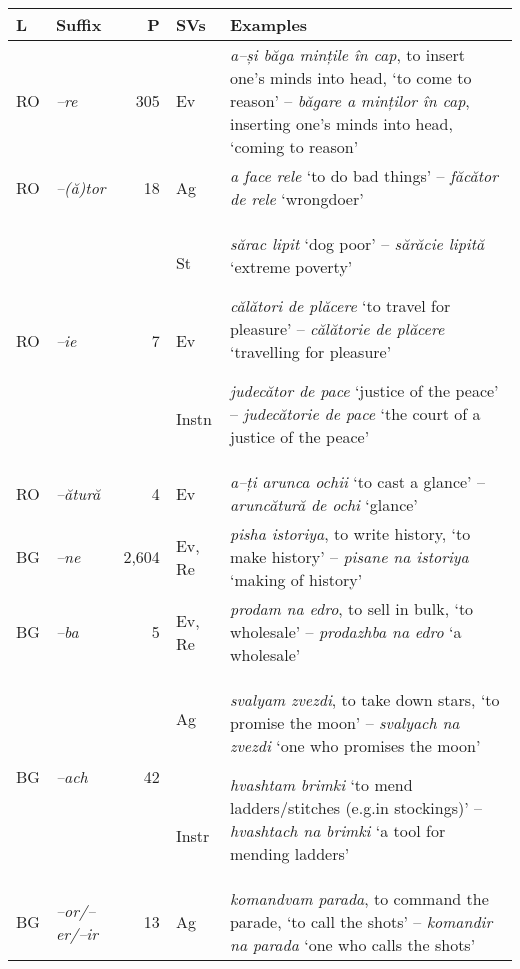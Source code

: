 \documentclass[output=paper]{langsci/langscibook}
\begin{document}
\begin{table}
\begin{tabular}{p{0.4cm} p{1.2cm} r p{1cm} p{6.9cm}}
\lsptoprule
{ \textbf{L}} &
{ \textbf{Suffix}} &
{ \textbf{P}} &
{ \textbf{SVs}} &
{ \textbf{Examples}}\\
\midrule
{ RO} &
{ \textit{–re}} &
{ 305} &
{ Ev} &
{ \textit{a–și băga mințile în cap},  to insert
one’s minds into head, ‘to come to reason’ -- \textit{băgare a minților în
cap}, inserting one’s minds into head, ‘coming to reason’}\\
{ RO} &
{ \textit{–(ă)tor}} &
{ 18} &
{ Ag} &
{ \textit{a face rele} ‘to do bad things’ --
\textit{făcător de rele} ‘wrongdoer’}\\
{ RO} &
{ \textit{–ie}} &
{ 7} &
{ St}

~

{ Ev}

~

{ Instn} &
{ \textit{sărac lipit} ‘dog poor’ -- \textit{sărăcie
lipită} ‘extreme poverty’}

{ \textit{călători de plăcere} ‘to travel for
pleasure’ -- \textit{călătorie de plăcere} ‘travelling for pleasure’}

{ \textit{judecător de pace} ‘justice of the
peace’ -- \textit{judecătorie de pace} ‘the court of a justice of the
peace’}\\

{ RO} &
{ \textit{–ătură}} &
{ 4} &
{ Ev} &
{ \textit{a–ți arunca ochii} ‘to cast a
glance’ –\textit{aruncătură de ochi} ‘glance’}\\
{ BG} &
{ \textit{–ne}} &
{ 2,604} &
{ Ev, Re} &
{ \textit{pisha istoriya}, to write history,
‘to make history’ – \textit{pisane na istoriya} ‘making of history’}\\
{ BG} &
{ \textit{–ba}} &
{ 5} &
{ Ev, Re} &
{ \textit{prodam na edro}, to sell in bulk,
‘to wholesale’ – \textit{prodazhba na edro} ‘a wholesale’}\\
{ BG} &
{ \textit{–ach}} &
{ 42} &
{ Ag}

~

~

{ Instr} &
{ \textit{svalyam zvezdi}, to take down stars,
‘to promise the moon’ -- \textit{svalyach na zvezdi} ‘one who promises the
moon’}

{ \textit{hvashtam brimki} ‘to mend
ladders/stitches (e.g.\@ in stockings)’ -- \textit{hvashtach na brimki}  ‘a tool
for mending ladders’}\\

{ BG} &
{ \textit{–or/–er/–ir}} &
{ 13} &
{ Ag} &
{ \textit{komandvam parada}, to command the
parade, ‘to call the shots’ -- \textit{komandir na parada} ‘one who calls
the shots’}\\


\end{tabular}
\end{table}
\end{document}
